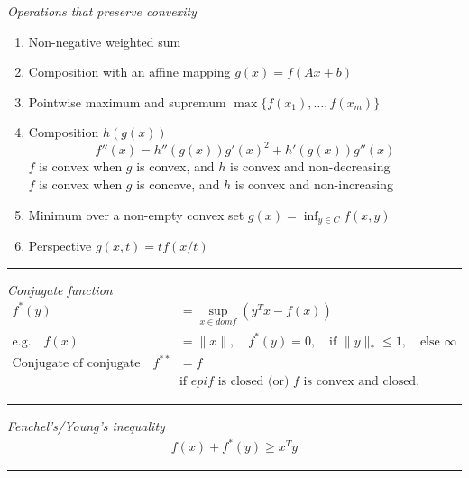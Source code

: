 \noindent
\textit{Operations that preserve convexity}
\begin{enumerate}
\item Non-negative weighted sum
\item Composition with an affine mapping \(g(x) = f(Ax + b)\)
\item Pointwise maximum and supremum \(\max\{f(x_1),\ldots,f(x_m)\}\)
\item Composition \(h(g(x))\)
  \[f''(x) = h''(g(x))g'(x)^2 + h'(g(x))g''(x)\]
\(f\) is convex when \(g\) is convex, and \(h\) is convex and non-decreasing\\
\(f\) is convex when \(g\) is concave, and \(h\) is convex and non-increasing
\item Minimum over a non-empty convex set \(g(x) = \inf_{y \in C} f(x,y)\)
\item Perspective \(g(x,t) = t f(x/t)\)
\end{enumerate}
\rule{\linewidth}{0.1mm}

\noindent
\textit{Conjugate function}
\begin{align*}
  f^*(y) &= \sup_{x \in dom f} (y^T x - f(x))\\
  \mbox{e.g.} \quad f(x) &= \|x\|, 
  \quad f^*(y) = 0, \quad \mbox{if } \|y\|_* \le 1,
  \quad \mbox{else }\infty\\
  \mbox{Conjugate of conjugate} \quad f^{**} &= f \\&\mbox{if } epi f
  \mbox{ is closed (or) } f \mbox{ is convex and closed.}
\end{align*}
\rule{\linewidth}{0.1mm}

\noindent
\textit{Fenchel's/Young's inequality}
\begin{align*}
  f(x) + f^*(y) \ge x^T y
\end{align*}
\rule{\linewidth}{0.1mm}
